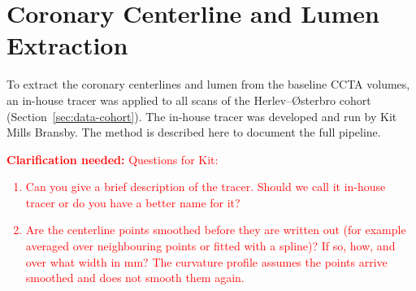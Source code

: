 \providecommand{\clarify}[1]{\textcolor{red}{\textbf{Clarification needed:} #1}}
\providecommand{\ask}[1]{\textcolor{red}{[#1]}}
\section{Coronary Centerline and Lumen Extraction}
\label{sec:method-tracer}

To extract the coronary centerlines and lumen from the baseline CCTA volumes, an in-house tracer was applied to all scans of the Herlev--{\O}sterbro cohort (Section~\ref{sec:data-cohort}). The in-house tracer was developed and run by Kit Mills Bransby. The method is described here to document the full pipeline. 


\clarify{Questions for Kit:
\begin{enumerate}
  \item Can you give a brief description of the tracer. Should we call it in-house tracer or do you have a better name for it?
  \item Are the centerline points smoothed before they are written out (for example averaged over neighbouring points or fitted with a spline)? If so, how, and over what width in mm? The curvature profile assumes the points arrive smoothed and does not smooth them again.
\end{enumerate}}
